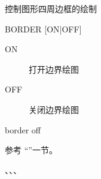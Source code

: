 \label{cmd:border}

控制图形四周边框的绘制

\begin{SACSTX}
BORDER [ON|OFF]
\end{SACSTX}

\begin{description}
\item [ON] 打开边界绘图
\item [OFF] 关闭边界绘图 
\end{description}

\begin{SACDFT}
border off
\end{SACDFT}

参考 ``''一节。

、、、
